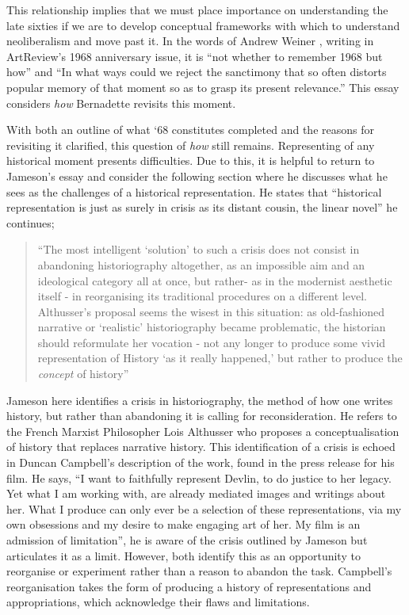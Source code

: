 \documentclass[12pt]{article}
\begin{document}
This relationship implies that we must place importance on understanding the late sixties if we are to develop conceptual frameworks with which to understand neoliberalism and move past it. In the words of Andrew Weiner \citeyear{Weiner:2018aa}, writing in ArtReview's 1968 anniversary issue, it is ``not whether to remember 1968 but how'' and ``In what ways could we reject the sanctimony that so often distorts popular memory of that moment so as to grasp its present relevance.'' This essay considers \textit{how} Bernadette revisits this moment. 

With both an outline of what `68 constitutes completed and the reasons for revisiting it clarified, this question of \textit{how} still remains. Representing of any historical moment presents difficulties. Due to this, it is helpful to return to Jameson's essay and consider the following section where he discusses what he sees as the challenges of a historical representation. He states that ``historical representation is just as surely in crisis as its distant cousin, the linear novel'' he continues; 

\begin{quote}
``The most intelligent `solution' to such a crisis does not consist in abandoning historiography altogether, as an impossible aim and an ideological category all at once, but rather- as in the modernist aesthetic itself - in reorganising its traditional procedures on a different level. Althusser's proposal seems the wisest in this situation: as old-fashioned narrative or `realistic' historiography became problematic, the historian should reformulate her vocation - not any longer to produce some vivid representation of History `as it really happened,' but rather to produce the \textit{concept} of history''\cite{Jameson:1984aa}
\end{quote}
 
Jameson here identifies a crisis in historiography, the method of how one writes history, but rather than abandoning it is calling for reconsideration. He refers to the French Marxist Philosopher Lois Althusser who proposes a conceptualisation of history that replaces narrative history. This identification of a crisis is echoed in Duncan Campbell's description of the work, found in the press release for his film. He says, ``I want to faithfully represent Devlin, to do justice to her legacy. Yet what I am working with, are already mediated images and writings about her. What I produce can only ever be a selection of these representations, via my own obsessions and my desire to make engaging art of her. My film is an admission of limitation''\citeyear{Campbell:2008aa},  he is aware of the crisis outlined by Jameson but articulates it as a limit. However, both identify this as an opportunity to reorganise or experiment rather than a reason to abandon the task. Campbell's reorganisation takes the form of producing a history of representations and appropriations, which acknowledge their flaws and limitations. 
\end{document}
